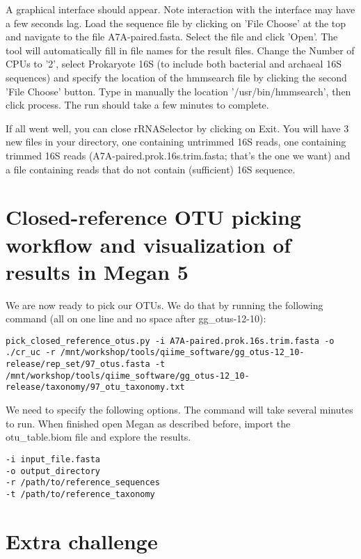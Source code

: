A graphical interface should appear. Note interaction with the interface may have a few seconds lag. Load the sequence file by clicking on 'File Choose' at the top and navigate to the file A7A-paired.fasta. Select the file and click 'Open'. The tool will automatically fill in file names for the result files. Change the Number of CPUs to '2', select Prokaryote 16S (to include both bacterial and archaeal 16S sequences) and specify the location of the hmmsearch file by clicking the second 'File Choose' button. Type in manually the location '/usr/bin/hmmsearch', then click process. The run should take a few minutes to complete.

If all went well, you can close rRNASelector by clicking on Exit. You will have 3 new files in your directory, one containing untrimmed 16S reads, one containing trimmed 16S reads (A7A-paired.prok.16s.trim.fasta; that's the one we want) and a file containing reads that do not contain (sufficient) 16S sequence.

\section{Closed-reference OTU picking workflow and visualization of results in Megan 5}
\begin{steps}
We are now ready to pick our OTUs. We do that by running the following command (all on one line and no space after gg\_otus-12-10):

\begin{lstlisting}
pick_closed_reference_otus.py -i A7A-paired.prok.16s.trim.fasta -o ./cr_uc -r /mnt/workshop/tools/qiime_software/gg_otus-12_10-release/rep_set/97_otus.fasta -t /mnt/workshop/tools/qiime_software/gg_otus-12_10-release/taxonomy/97_otu_taxonomy.txt
\end{lstlisting}
\end{steps}

\begin{steps}
We need to specify the following options. 
The command will take several minutes to run. When finished open Megan as described before, import the otu\_table.biom file and explore the results.

\begin{lstlisting}
-i input_file.fasta
-o output_directory
-r /path/to/reference_sequences
-t /path/to/reference_taxonomy

\end{lstlisting}
\end{steps}

\section{Extra challenge}

